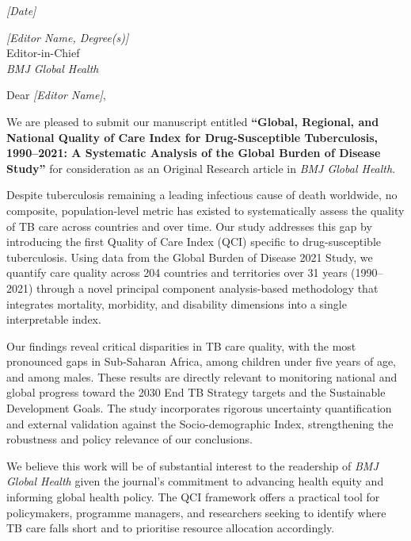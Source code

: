 \documentclass[11pt]{article}
\begin{document}
\begin{flushright}
\textit{[Date]}  %
\end{flushright}

\vspace{0.5em}

\textit{[Editor Name, Degree(s)]}\\
Editor-in-Chief\\
\textit{BMJ Global Health}

\vspace{0.5em}

Dear \textit{[Editor Name]},

We are pleased to submit our manuscript entitled \textbf{``Global, Regional, and National Quality of Care Index for Drug-Susceptible Tuberculosis, 1990--2021: A Systematic Analysis of the Global Burden of Disease Study''} for consideration as an Original Research article in \textit{BMJ Global Health}.

Despite tuberculosis remaining a leading infectious cause of death worldwide, no composite, population-level metric has existed to systematically assess the quality of TB care across countries and over time. Our study addresses this gap by introducing the first Quality of Care Index (QCI) specific to drug-susceptible tuberculosis. Using data from the Global Burden of Disease 2021 Study, we quantify care quality across 204 countries and territories over 31 years (1990--2021) through a novel principal component analysis-based methodology that integrates mortality, morbidity, and disability dimensions into a single interpretable index.

Our findings reveal critical disparities in TB care quality, with the most pronounced gaps in Sub-Saharan Africa, among children under five years of age, and among males. These results are directly relevant to monitoring national and global progress toward the 2030 End TB Strategy targets and the Sustainable Development Goals. The study incorporates rigorous uncertainty quantification and external validation against the Socio-demographic Index, strengthening the robustness and policy relevance of our conclusions.

We believe this work will be of substantial interest to the readership of \textit{BMJ Global Health} given the journal's commitment to advancing health equity and informing global health policy. The QCI framework offers a practical tool for policymakers, programme managers, and researchers seeking to identify where TB care falls short and to prioritise resource allocation accordingly.
\end{document}
